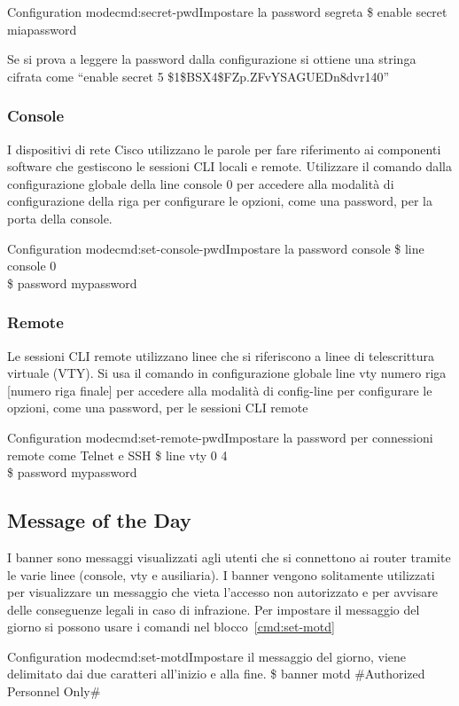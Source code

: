 \begin{cmds}{Configuration mode}{cmd:secret-pwd}{Impostare la \textcolor{Highlight1}{password} segreta}
    \$ enable secret \textcolor{Highlight1}{miapassword}
\end{cmds}

Se si prova a leggere la password dalla configurazione si ottiene una stringa cifrata come ``enable secret 5 \$1\$BSX4\$FZp.ZFvYSAGUEDn8dvr140''

\subsubsection{Console}
I dispositivi di rete Cisco utilizzano le parole per fare riferimento ai componenti software che gestiscono le sessioni CLI locali e remote. Utilizzare il comando dalla configurazione globale della line console 0 per accedere alla modalità di configurazione della riga per configurare le opzioni, come una password, per la porta della console.

\begin{cmds}{Configuration mode}{cmd:set-console-pwd}{Impostare la password console}
    \$ line console 0\\
    \$ password \textcolor{Highlight1}{mypassword}
\end{cmds}

\subsubsection{Remote}
Le sessioni CLI remote utilizzano linee che si riferiscono a linee di telescrittura virtuale (VTY). Si usa il comando in configurazione globale line vty numero riga [numero riga finale] per accedere alla modalità di config-line per configurare le opzioni, come una password, per le sessioni CLI remote

\begin{cmds}{Configuration mode}{cmd:set-remote-pwd}{Impostare la password per connessioni remote come Telnet e SSH}
    \$ line vty 0 4\\
    \$ password \textcolor{Highlight1}{mypassword}
\end{cmds}

\subsection{Message of the Day}
I banner sono messaggi visualizzati agli utenti che si connettono ai router tramite le varie linee (console, vty e ausiliaria). I banner vengono solitamente utilizzati per visualizzare un messaggio che vieta l’accesso non autorizzato e per avvisare delle conseguenze legali in caso di infrazione. Per impostare il messaggio del giorno si possono usare i comandi nel blocco~\ref{cmd:set-motd}

\begin{cmds}{Configuration mode}{cmd:set-motd}{Impostare il messaggio del giorno, viene delimitato dai due \textcolor{Highlight2}{caratteri} all'inizio e alla fine.}
    \$ banner motd \#Authorized Personnel Only\#
\end{cmds}
